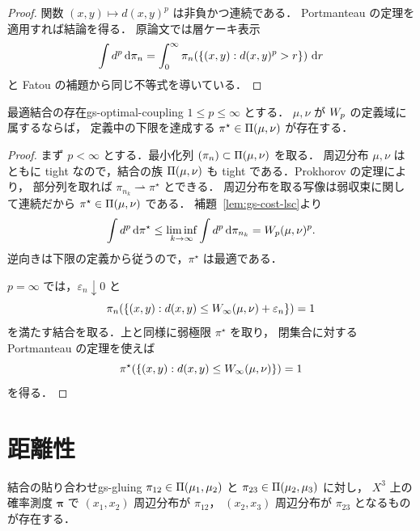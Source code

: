 \begin{proof}
  関数 $(x,y)\mapsto d(x,y)^p$ は非負かつ連続である．
  Portmanteau の定理を適用すれば結論を得る．
  原論文では層ケーキ表示
  \[
    \int d^p\,\mathrm{d}\pi_n
    =
    \int_0^\infty
    \pi_n\!\left(\{(x,y):d(x,y)^p>r\}\right)\,\mathrm{d} r
  \]
  と Fatou の補題から同じ不等式を導いている．
\end{proof}

\begin{proposition}{最適結合の存在}{gs-optimal-coupling}
  $1\leq p\leq\infty$ とする．
  $\mu,\nu$ が $W_p$ の定義域に属するならば，
  定義中の下限を達成する
  $\pi^\star\in\Pi(\mu,\nu)$ が存在する．
\end{proposition}

\begin{proof}
  まず $p<\infty$ とする．最小化列
  $(\pi_n)\subset\Pi(\mu,\nu)$ を取る．
  周辺分布 $\mu,\nu$ はともに tight なので，結合の族
  $\Pi(\mu,\nu)$ も tight である．Prokhorov の定理により，
  部分列を取れば $\pi_{n_k}\rightharpoonup\pi^\star$ とできる．
  周辺分布を取る写像は弱収束に関して連続だから
  $\pi^\star\in\Pi(\mu,\nu)$ である．
  補題~\ref{lem:gs-cost-lsc}より
  \[
    \int d^p\,\mathrm{d}\pi^\star
    \leq
    \liminf_{k\to\infty}\int d^p\,\mathrm{d}\pi_{n_k}
    =
    W_p(\mu,\nu)^p.
  \]
  逆向きは下限の定義から従うので，$\pi^\star$ は最適である．

  $p=\infty$ では，$\varepsilon_n\downarrow0$ と
  \[
    \pi_n\!\left(
      \{(x,y):d(x,y)\leq W_\infty(\mu,\nu)+\varepsilon_n\}
    \right)=1
  \]
  を満たす結合を取る．上と同様に弱極限 $\pi^\star$ を取り，
  閉集合に対する Portmanteau の定理を使えば
  \[
    \pi^\star\!\left(
      \{(x,y):d(x,y)\leq W_\infty(\mu,\nu)\}
    \right)=1
  \]
  を得る．
\end{proof}

\section{距離性}
\label{sec:metric-property}

\begin{lemma}{結合の貼り合わせ}{gs-gluing}
  $\pi_{12}\in\Pi(\mu_1,\mu_2)$ と
  $\pi_{23}\in\Pi(\mu_2,\mu_3)$ に対し，
  $X^3$ 上の確率測度 $\boldsymbol{\pi}$ で
  $(x_1,x_2)$ 周辺分布が $\pi_{12}$，
  $(x_2,x_3)$ 周辺分布が $\pi_{23}$ となるものが存在する．
\end{lemma}

